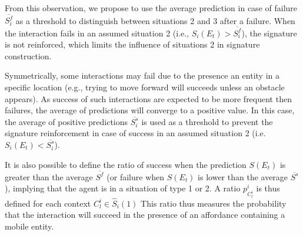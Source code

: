 \documentclass[conference]{IEEEtran}
\begin{document}
From this observation, we propose to use the average prediction in case of failure $\overline{S_i^f}$ as a threshold to distinguish between situations 2 and 3 after a failure. 
When the interaction fails in an assumed situation 2 (i.e., $S_i(E_t)>\overline{S_i^f}$), the signature is not reinforced, which limits the influence of situations 2 in signature construction. 


Symmetrically, some interactions may fail due to the presence an entity in a specific location (e.g., trying to move forward will succeeds unless an obstacle appears).
As success of such interactions are expected to be more frequent then failures, the average of predictions will converge to a positive value. 
In this case, the average of positive predictions $\overline{S_i^s}$ is used as a threshold to prevent the signature reinforcement in case of success in an assumed situation 2 (i.e. $S_i(E_t)<\overline{S_i^s}$).



It is also possible to define the ratio of success when the prediction $S(E_t)$ is greater than the average $\overline{S^f}$ (or failure when $S(E_t)$ is lower than the average $\overline{S^s}$), implying that the agent is in a situation of type 1 or 2. A ratio $p_{C_l^i}^i$ is thus defined for each context $C_l^i \in \hat{S}_i(1)$
This ratio thus measures the probability that the interaction will succeed in the presence of an affordance containing a mobile entity.
\end{document}
